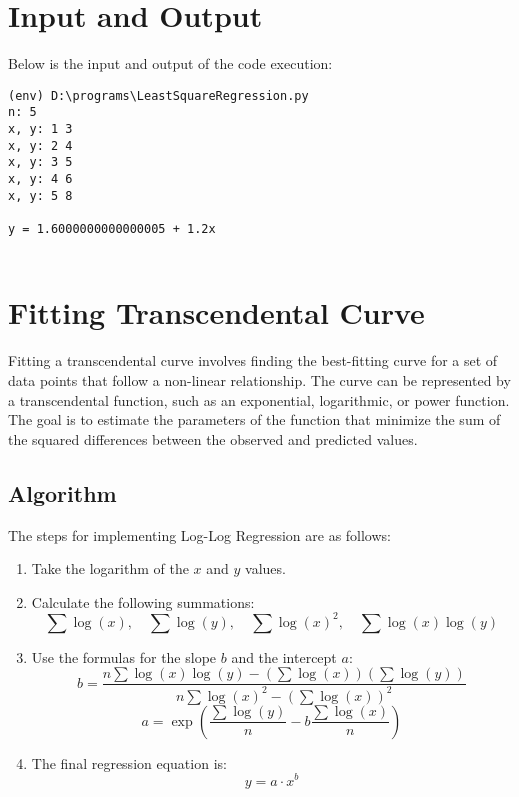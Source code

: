 \documentclass[12pt]{article}
\begin{document}
    \section*{Input and Output}
    \noindent Below is the input and output of the code execution:
                
    {\small
    \begin{verbatim}
(env) D:\programs\LeastSquareRegression.py
n: 5
x, y: 1 3
x, y: 2 4
x, y: 3 5
x, y: 4 6
x, y: 5 8

y = 1.6000000000000005 + 1.2x
        
    \end{verbatim}
    }

    \newpage
    \section*{Fitting Transcendental Curve}

    Fitting a transcendental curve involves finding the best-fitting curve for a set of data points that follow a non-linear relationship. The curve can be represented by a transcendental function, such as an exponential, logarithmic, or power function. The goal is to estimate the parameters of the function that minimize the sum of the squared differences between the observed and predicted values.
        
        \subsection*{Algorithm}
        
        The steps for implementing Log-Log Regression are as follows:
        
        \begin{enumerate}
            \item Take the logarithm of the \( x \) and \( y \) values.
            \item Calculate the following summations:
            \[
                \sum \log(x), \quad \sum \log(y), \quad \sum \log(x)^2, \quad \sum \log(x) \log(y)
                \]
                \item Use the formulas for the slope \( b \) and the intercept \( a \):
                \[
                    b = \frac{n \sum \log(x) \log(y) - (\sum \log(x))(\sum \log(y))}{n \sum \log(x)^2 - (\sum \log(x))^2}
                    \]
                    \[
                        a = \exp \left( \frac{\sum \log(y)}{n} - b \frac{\sum \log(x)}{n} \right)
                        \]
                        \item The final regression equation is:
                        \[
                            y = a \cdot x^b
                            \]
                        \end{enumerate}
                     
\end{document}
